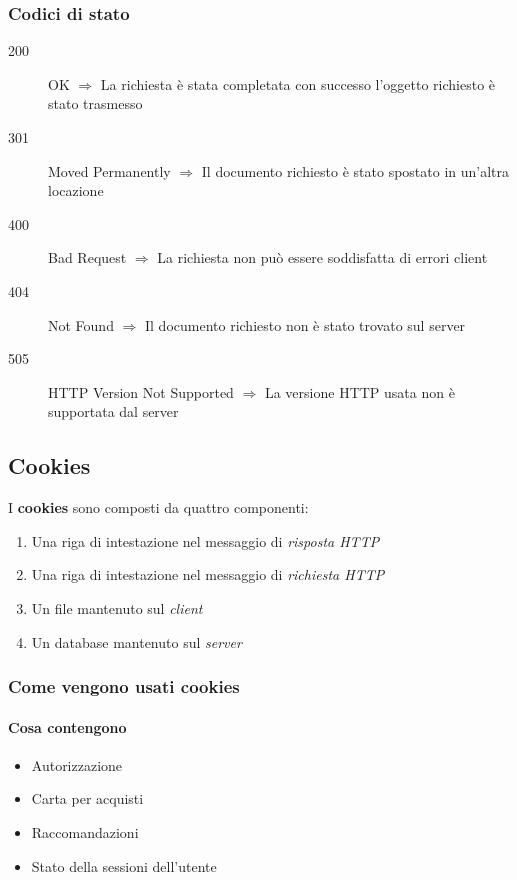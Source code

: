         \subsubsection{Codici di stato}
        \begin{description}
            \item[200] OK $\Rightarrow$ La richiesta è stata completata con successo l'oggetto richiesto è stato trasmesso
            \item[301] Moved Permanently $\Rightarrow$  Il documento richiesto è stato spostato in un'altra locazione
            \item[400] Bad Request $\Rightarrow$ La richiesta non può essere soddisfatta di errori client
            \item[404] Not Found $\Rightarrow$ Il documento richiesto non è stato trovato sul server
            \item[505] HTTP Version Not Supported $\Rightarrow$ La versione HTTP usata non è supportata dal server
        \end{description}
    \subsection{Cookies}
        I \textbf{cookies} sono composti da quattro componenti:
        \begin{enumerate}
            \item Una riga di intestazione nel messaggio di \textit{risposta HTTP} %
            \item Una riga di intestazione nel messaggio di \textit{richiesta HTTP} %
            \item Un file mantenuto sul \textit{client}
            \item Un database mantenuto sul \textit{server}
        \end{enumerate}
        \subsubsection{Come vengono usati cookies}
            \paragraph{Cosa contengono}
                \begin{itemize}
                    \item Autorizzazione
                    \item Carta per acquisti
                    \item Raccomandazioni
                    \item Stato della sessioni dell'utente
                \end{itemize}
